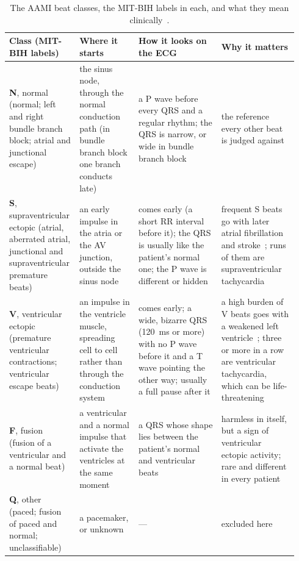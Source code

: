 \documentclass[11pt]{article}
\begin{document}
\begin{table}[tbp]\centering\footnotesize\setlength{\tabcolsep}{4pt}
\caption{The AAMI beat classes, the MIT-BIH labels in each, and what they mean clinically~\cite{goldberger2017,aami2012ec57}.}\label{tab:classes}
\begin{tabular}{@{}L{0.2\linewidth}L{0.2\linewidth}L{0.28\linewidth}L{0.26\linewidth}@{}}
\toprule
Class (MIT-BIH labels) & Where it starts & How it looks on the ECG & Why it matters \\
\midrule
\textbf{N}, normal (normal; left and right bundle branch block; atrial and junctional escape) & the sinus node, through the normal
conduction path (in bundle branch block one branch conducts late) & a P wave before every QRS and a regular rhythm; the QRS is narrow, or
wide in bundle branch block & the reference every other beat is judged against \\ \addlinespace
\textbf{S}, supraventricular ectopic (atrial, aberrated atrial, junctional and supraventricular premature beats) & an early impulse in
the atria or the AV junction, outside the sinus node & comes early (a short RR interval before it); the QRS is usually like the patient's
normal one; the P wave is different or hidden & frequent S beats go with later atrial fibrillation and stroke~\cite{binici2010}; runs
of them are supraventricular tachycardia \\ \addlinespace
\textbf{V}, ventricular ectopic (premature ventricular contractions; ventricular escape beats) & an impulse in the ventricle muscle,
spreading cell to cell rather than through the conduction system & comes early; a wide, bizarre QRS (120~ms or more) with no P wave
before it and a T wave pointing the other way; usually a full pause after it & a high burden of V beats goes with a weakened left
ventricle~\cite{baman2010}; three or more in a row are ventricular tachycardia, which can be life-threatening \\ \addlinespace
\textbf{F}, fusion (fusion of a ventricular and a normal beat) & a ventricular and a normal impulse that activate the ventricles at the
same moment & a QRS whose shape lies between the patient's normal and ventricular beats & harmless in itself, but a sign of ventricular
ectopic activity; rare and different in every patient \\ \addlinespace
\textbf{Q}, other (paced; fusion of paced and normal; unclassifiable) & a pacemaker, or unknown & --- & excluded here \\
\bottomrule
\end{tabular}
\end{table}
\end{document}
